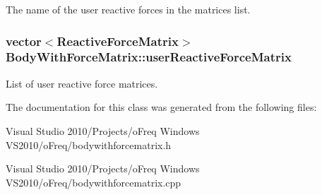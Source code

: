 The name of the user reactive forces in the matrices list. \hypertarget{class_body_with_force_matrix_a301fe6541bda12f4786c254688b1b89f}{
\subsubsection[{user\-Reactive\-Force\-Matrix}]{\setlength{\rightskip}{0pt plus 5cm}vector$<${\bf Reactive\-Force\-Matrix}$>$ Body\-With\-Force\-Matrix\-::user\-Reactive\-Force\-Matrix}}\label{class_body_with_force_matrix_a301fe6541bda12f4786c254688b1b89f}
List of user reactive force matrices. 

The documentation for this class was generated from the following files\-:\begin{DoxyCompactItemize}
\item 
Visual Studio 2010/\-Projects/o\-Freq Windows V\-S2010/o\-Freq/bodywithforcematrix.\-h\item 
Visual Studio 2010/\-Projects/o\-Freq Windows V\-S2010/o\-Freq/bodywithforcematrix.\-cpp\end{DoxyCompactItemize}
